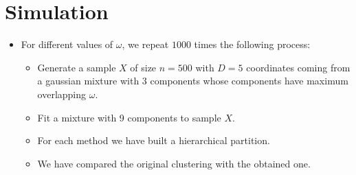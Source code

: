 \documentclass[10pt, a4paper]{article}
\newcommand{\m}[1]{\boldsymbol{#1}}
\begin{document}


%
%
%
%



\section{Simulation}

\begin{itemize}
\item For different values of $\omega$, we repeat $1000$ times the following process:
\begin{itemize}
\item Generate a sample $X$ of size $n=500$ with $D=5$ coordinates coming from a gaussian mixture with $3$ components whose components have maximum overlapping $\omega$.
\item Fit a mixture with 9 components to sample $X$.
\item For each method we have built a hierarchical partition.
\item We have compared the original clustering with the obtained one. 
\end{itemize}


\end{itemize}
\end{document}
